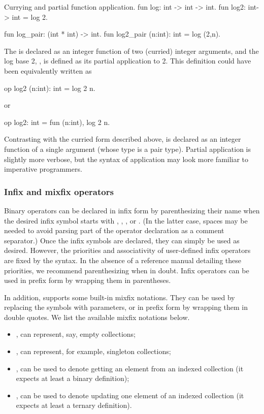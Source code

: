 \begin{easycrypt}[label={lst:currying}]{Currying and partial function application.}
fun log: int -> int -> int.
fun log2: int-> int = log 2.

fun log_pair: (int * int) -> int.
fun log2_pair (n:int): int = log (2,n).
\end{easycrypt}

The  is declared as an integer function of two (curried) integer
arguments, and the log base 2, , is defined as its partial
application to 2. This definition could have been equivalently written as
\begin{easycrypt}[frame=none]{}
op log2 (n:int): int = log 2 n.
\end{easycrypt}
or
\begin{easycrypt}[frame=none]{}
op log2: int = fun (n:int), log 2 n.
\end{easycrypt}
Contrasting with the curried form described above,  is declared
as an integer function of a single argument (whose type is a pair type).
Partial application is slightly more verbose, but the syntax of application may
look more familiar to imperative programmers.

\subsubsection*{Infix and mixfix operators}
Binary operators can be declared in infix form by parenthesizing their name when
the desired infix symbol starts with \ec{+}, \ec{:}, \ec{^},  or \ec{*}. (In the
latter case, spaces may be needed to avoid parsing part of the operator
declaration as a comment separator.) Once the infix symbols are declared, they
can simply be used as desired. However, the priorities and associativity of
user-defined infix operators are fixed by the syntax. In the absence of a
reference manual detailing these priorities, we recommend parenthesizing when
in doubt. Infix operators can be used in prefix form by wrapping them in
parentheses.

In addition, \EasyCrypt supports some built-in mixfix notations. They can be
used by replacing the \ec{_} symbols with parameters, or in prefix form by
wrapping them in double quotes. We list the available mixfix notations below.
\begin{itemize}\itemsep-.5em
\item \rawec{[]}, can represent, say, empty collections;
\item \rawec{[_]}, can represent, for example, singleton collections;
\item {}, can be used to denote getting an element from an indexed
  collection (it expects at least a binary definition);
\item {}, can be used to denote updating one element of an
  indexed collection (it expects at least a ternary definition).
\end{itemize}

